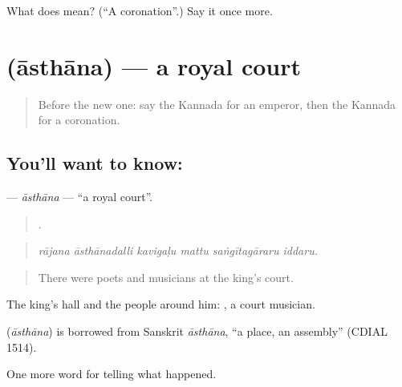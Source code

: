 \begin{tcolorbox}[breakable,colback=teal!4,colframe=teal!35!black,title={Before you move on}]
What does  mean? (\textquotedblleft{}A coronation\textquotedblright{}.) Say it once more.
\end{tcolorbox}
\section[\texorpdfstring{\kn{ಆಸ್ಥಾನ} (āsthāna)}{ಆಸ್ಥಾನ (āsthāna)}]{ (āsthāna) — a royal court}

\label{lesson:KA-C354-asthana}



\begin{quote}
Before the new one: say the Kannada for an emperor, then the Kannada for a coronation.
\end{quote}

\subsection*{You'll want to know: }
\textbf{} — \emph{āsthāna} — \textquotedblleft{}a royal court\textquotedblright{}.

\begin{quote}
     .
\end{quote}

\begin{quote}
\emph{rājana āsthānadalli kavigaḷu mattu saṅgītagāraru iddaru.}
\end{quote}

\begin{quote}
There were poets and musicians at the king's court.
\end{quote}

The king's hall and the people around him:  , a court musician.

\begin{cousinweb}
\textbf{} (\emph{āsthāna}) is borrowed from Sanskrit \emph{āsthāna}, \textquotedblleft{}a place, an assembly\textquotedblright{} (CDIAL 1514).
\end{cousinweb}

\begin{grammarlens}[title={What you've built}]
One more word for telling what happened.
\end{grammarlens}

